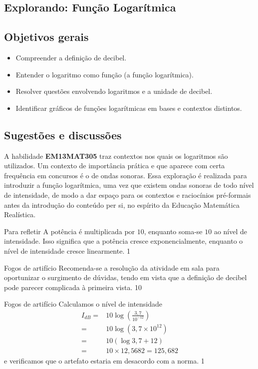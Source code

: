 \clearpage
\def\currentcolor{session1}
\begin{texto}
{
	\section{Explorando: Função Logarítmica}
	\subsection{Objetivos gerais}
	\begin{itemize}
	\item Compreender a definição de decibel.
	\item Entender o logaritmo como função (a função logarítmica).
	\item Resolver questões envolvendo logaritmos e a unidade de decibel.
	\item Identificar gráficos de funções logarítmicas em bases e contextos distintos.
	\end{itemize}

	\subsection{Sugestões e discussões}
	A habilidade \textbf{EM13MAT305} traz contextos nos quais os logaritmos são utilizados. Um contexto de importância prática e que aparece com certa frequência em concursos é o de ondas sonoras. Essa exploração é realizada para introduzir a função logarítmica, uma vez que existem ondas sonoras de todo nível de intensidade, de modo a dar espaço para os contextos e raciocínios pré-formais antes da introdução do conteúdo per si, no espírito da Educação Matemática Realística.
}
\end{texto}
\marginpar{\vspace{.5em}}
\begin{answer}{Para refletir}
{
	A potência é multiplicada por $10$, enquanto soma-se $10$ ao nível de intensidade. Isso significa que a potência cresce exponencialmente, enquanto o nível de intensidade cresce linearmente.
}{1}
\end{answer}
\clearmargin
\begin{sugestions}{Fogos de artifício}
{
	Recomenda-se a resolução da atividade em sala para oportunizar o surgimento de dúvidas, tendo em vista que a definição de decibel pode parecer complicada à primeira vista.
}{1}{0}
\end{sugestions}
\begin{answer}{Fogos de artifício}
{
	Calculamos o nível de intensidade
\begin{align*}
	I_{dB} =& 10 \log \left(\frac{3{,}7}{10^{-12}}\right)\\
	=& 10 \log (3{,}7\times 10^{12})\\
	=& 10 (\log 3{,}7+12)\\
	=& 10\times 12{,}5682 = 125{,}682
	\end{align*}
	e verificamos que o artefato estaria em desacordo com a norma.
}{1}
\end{answer}
\def\currentcolor{session4}
\begin{texto}
{
	
}
\end{texto}

